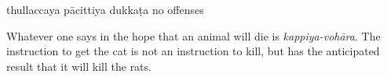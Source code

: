 \begin{exam}{\autoExamName}
\begin{problem*}
\begin{parts}
    \bigskip

    \begin{answers}{4}
      \bChoices
       thullaccaya \eAns
       pācittiya\eAns
       dukkaṭa\eAns
       no offenses\eAns
      \eChoices
    \end{answers}

    \begin{solution}
      Whatever one says in the hope that an animal will die is \emph{kappiya-vohāra}.
      The instruction to get the cat is not an instruction to kill,
      but has the anticipated result that it will kill the rats.
    \end{solution}

  \end{parts}

\end{problem*}

\end{exam}







